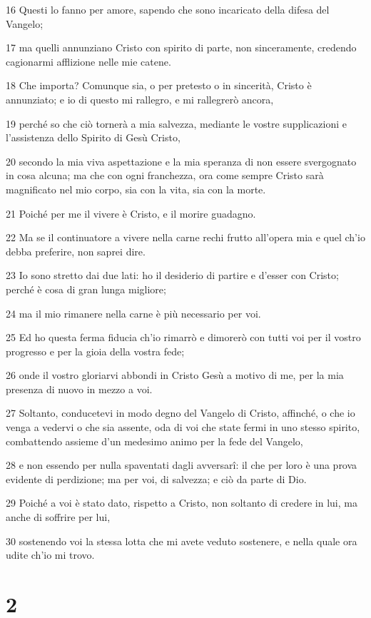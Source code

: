 \par 16 Questi lo fanno per amore, sapendo che sono incaricato della difesa del Vangelo;
\par 17 ma quelli annunziano Cristo con spirito di parte, non sinceramente, credendo cagionarmi afflizione nelle mie catene.
\par 18 Che importa? Comunque sia, o per pretesto o in sincerità, Cristo è annunziato; e io di questo mi rallegro, e mi rallegrerò ancora,
\par 19 perché so che ciò tornerà a mia salvezza, mediante le vostre supplicazioni e l'assistenza dello Spirito di Gesù Cristo,
\par 20 secondo la mia viva aspettazione e la mia speranza di non essere svergognato in cosa alcuna; ma che con ogni franchezza, ora come sempre Cristo sarà magnificato nel mio corpo, sia con la vita, sia con la morte.
\par 21 Poiché per me il vivere è Cristo, e il morire guadagno.
\par 22 Ma se il continuatore a vivere nella carne rechi frutto all'opera mia e quel ch'io debba preferire, non saprei dire.
\par 23 Io sono stretto dai due lati: ho il desiderio di partire e d'esser con Cristo; perché è cosa di gran lunga migliore;
\par 24 ma il mio rimanere nella carne è più necessario per voi.
\par 25 Ed ho questa ferma fiducia ch'io rimarrò e dimorerò con tutti voi per il vostro progresso e per la gioia della vostra fede;
\par 26 onde il vostro gloriarvi abbondi in Cristo Gesù a motivo di me, per la mia presenza di nuovo in mezzo a voi.
\par 27 Soltanto, conducetevi in modo degno del Vangelo di Cristo, affinché, o che io venga a vedervi o che sia assente, oda di voi che state fermi in uno stesso spirito, combattendo assieme d'un medesimo animo per la fede del Vangelo,
\par 28 e non essendo per nulla spaventati dagli avversarî: il che per loro è una prova evidente di perdizione; ma per voi, di salvezza; e ciò da parte di Dio.
\par 29 Poiché a voi è stato dato, rispetto a Cristo, non soltanto di credere in lui, ma anche di soffrire per lui,
\par 30 sostenendo voi la stessa lotta che mi avete veduto sostenere, e nella quale ora udite ch'io mi trovo.

\chapter{2}


